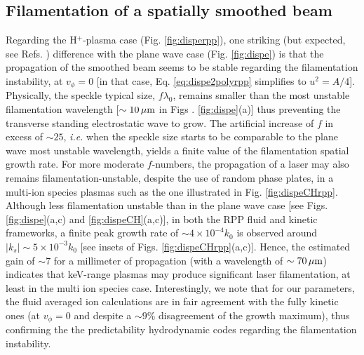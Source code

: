 \documentclass[
 reprint,
 amsmath,amssymb,
 aps,
]{revtex4-1}
\begin{document}
\subsection{Filamentation of a spatially smoothed beam}
Regarding the H$^+$-plasma case (Fig. \ref{fig:disperpp}), one striking (but expected, see Refs. \cite[]{NatPhys_Glenzer,PRL_Sarri_2011}) difference with the plane wave case  (Fig. \ref{fig:dispe}) is that the propagation of the smoothed beam seems to be stable regarding the filamentation instability, at $v_\phi=0$ [in that case, Eq. \eqref{eq:dispe2polyrpp} simplifies to $u^2=A/4$].
Physically, the speckle typical size, $f\lambda_0$, remains smaller than the most unstable filamentation wavelength [$\sim 10 \,\rm\mu m$ in Figs . \ref{fig:dispe}(a)] thus preventing the transverse standing electrostatic wave to grow. The artificial increase of $f$ in excess of $\sim 25$, \emph{i.e.} when the speckle size starts to be comparable to the plane wave most unstable wavelength,  yields a finite value of the filamentation spatial growth rate. For more moderate  $f$-numbers, the propagation of a laser may  also remains filamentation-unstable, despite the use of random phase plates,  in  a multi-ion species plasmas such as the one illustrated in Fig. \ref{fig:dispeCHrpp}. Although less filamentation unstable than in the plane wave case [see Figs. \ref{fig:dispe}(a,c) and \ref{fig:dispeCH}(a,c)], in both the RPP fluid and kinetic frameworks, a finite peak growth rate of $\sim 4\times 10^{-4}k_0 $ is observed around $\vert k_s\vert \sim 5\times 10^{-3}k_0$ [see insets of Figs. \ref{fig:dispeCHrpp}(a,c)].
Hence, the estimated  gain of $\sim 7$   for a millimeter of propagation (with a wavelength of $\sim 70 \,\rm \mu m$) indicates that keV-range plasmas may produce significant laser filamentation, at least in the multi ion species case.
Interestingly, we note that  for our parameters, the fluid averaged ion calculations  are in fair agreement with the fully kinetic ones (at $v_\phi=0$ and despite a $\sim 9\%$ disagreement of the growth maximum), thus confirming the  the predictability   hydrodynamic codes regarding the filamentation instability. 
\end{document}
